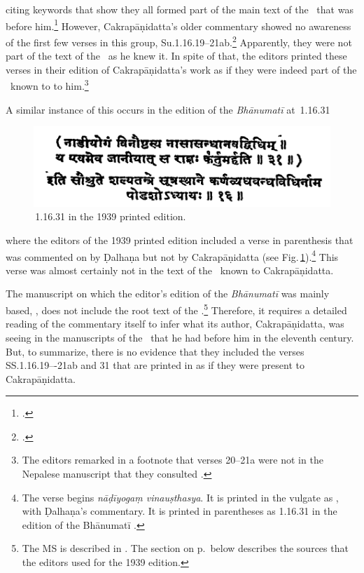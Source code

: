 citing keywords that show they all
formed part of the main text of the \SS\ that was before
him.\footnote{.} However, Cakrapāṇidatta's older
commentary showed no awareness of the first few verses in this group,
Su.1.16.19--21ab.\footcite[130--131]{acar-1939}  Apparently, they were not part of
the text of the \SS\ as he knew it.  In spite of that, the editors printed these
verses in their edition of Cakrapāṇidatta's work as if they were indeed part of
the \SS\ known to to him.\footnote{The editors remarked in a footnote that verses
20--21a were not in the Nepalese manuscript that they consulted \citep[130,
n.\,2]{acar-1939}.}

A similar instance of this occurs in the edition of the \emph{Bhānumatī} at \SS\,1.16.31 
\begin{figure}[t]
    \centering
    \includegraphics[width=.75\linewidth]{media/nadiyogam}
    \caption{\SS\,1.16.31 in the 1939 printed edition.}
    \label{fig:nadiyogam}
\end{figure}
where the editors of the 1939 printed edition included a verse in parenthesis that was
commented on by Ḍalhaṇa but not by Cakrapāṇidatta (see 
Fig.\,\ref{fig:nadiyogam}).\footnote{The verse begins 
\emph{nāḍīyogaṃ vinauṣthasya}.  It is printed in the vulgate as 
, with Ḍalhaṇa's commentary.  It is printed in parentheses as 1.16.31 in the 
edition of the Bhānumatī \citep[133]{acar-1939}.} This verse was almost certainly not in the 
text of the \SS\ known to Cakrapāṇidatta. 



The manuscript on which the editor's edition of the \emph{Bhānumatī} was
mainly based,  , does not include the root text of 
the \SS.\footnote{%
The MS is described in \cite[vol.\,1.5, 928, \#2647]{egge-1887}. 
The section on p.\,\pageref{1939edition} below describes the sources that the editors used 
for the 1939 edition.}  Therefore, it requires a detailed reading  of the commentary itself to 
infer what its author, Cakrapāṇidatta, was seeing in the manuscripts of the \SS\ that he had 
before him in the eleventh century.  But, to summarize, there is no evidence that they  
included the verses SS.1.16.19–-21ab and 31 that are printed in \cite{acar-1939} as if they 
were present to Cakrapāṇidatta. 

